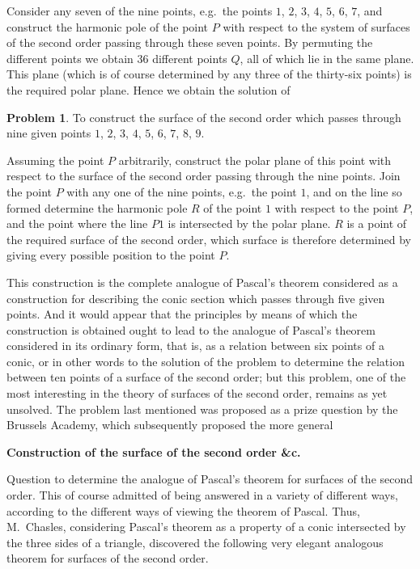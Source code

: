 \documentclass[11pt,a4paper]{article}
\theoremstyle{definition}
\newtheorem*{problem}{Problem}
\begin{document}
Consider any seven of the nine points, e.g.\ the points $1$, $2$, $3$, $4$, $5$, $6$, $7$, and construct the harmonic pole of the point $P$ with respect to the system of surfaces of the second order passing through these seven points. By permuting the different points we obtain $36$ different points $Q$, all of which lie in the same plane. This plane (which is of course determined by any three of the thirty-six points) is the required polar plane. Hence we obtain the solution of

\begin{problem}
To construct the surface of the second order which passes through nine given points $1$, $2$, $3$, $4$, $5$, $6$, $7$, $8$, $9$.
\end{problem}

Assuming the point $P$ arbitrarily, construct the polar plane of this point with respect to the surface of the second order passing through the nine points. Join the point $P$ with any one of the nine points, e.g.\ the point $1$, and on the line so formed determine the harmonic pole $R$ of the point $1$ with respect to the point $P$, and the point where the line $P1$ is intersected by the polar plane. $R$ is a point of the required surface of the second order, which surface is therefore determined by giving every possible position to the point $P$.

This construction is the complete analogue of Pascal's theorem considered as a construction for describing the conic section which passes through five given points. And it would appear that the principles by means of which the construction is obtained ought to lead to the analogue of Pascal's theorem considered in its ordinary form, that is, as a relation between six points of a conic, or in other words to the solution of the problem to determine the relation between ten points of a surface of the second order; but this problem, one of the most interesting in the theory of surfaces of the second order, remains as yet unsolved. The problem last mentioned was proposed as a prize question by the Brussels Academy, which subsequently proposed the more general

\newpage

\setcounter{page}{427}

\begin{center}
\textbf{Construction of the surface of the second order \&c.}
\end{center}

Question to determine the analogue of Pascal's theorem for surfaces of the second order. This of course admitted of being answered in a variety of different ways, according to the different ways of viewing the theorem of Pascal. Thus, M.~Chasles, considering Pascal's theorem as a property of a conic intersected by the three sides of a triangle, discovered the following very elegant analogous theorem for surfaces of the second order.
\end{document}
